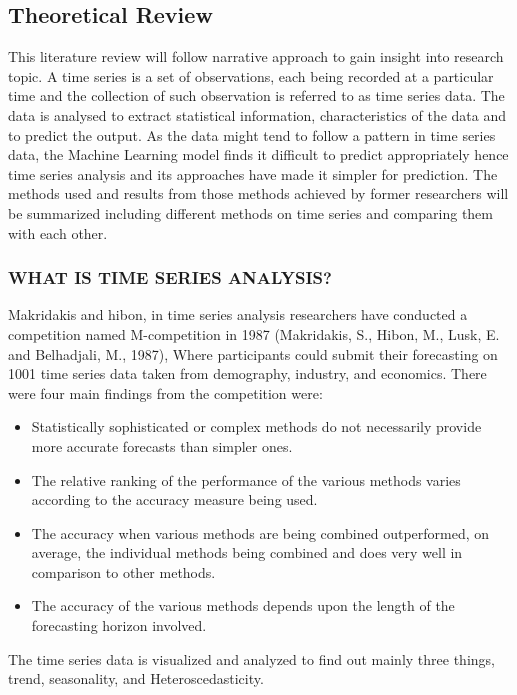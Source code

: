 \documentclass[12pt,a4paper]{article}
\begin{document}
\begin{flushleft}
		\subsection{Theoretical Review}
		This literature review will follow narrative approach to gain insight into research topic. A time series is a set of observations, each being recorded at a particular time and the collection of such observation is referred to as time series data. The data is analysed to extract statistical information, characteristics of the data and to predict the output. As the data might tend to follow a pattern in time series data, the Machine Learning model finds it difficult to predict appropriately hence time series analysis and its approaches have made it simpler for prediction. The methods used and results from those methods achieved by former researchers will be summarized including different methods on time series and comparing them with each other.
		
		\subsubsection{WHAT IS TIME SERIES ANALYSIS?}
		
		Makridakis and hibon, in time series analysis researchers have conducted a competition named M-competition in 1987 (Makridakis, S., Hibon, M., Lusk, E. and Belhadjali, M., 1987), Where participants could submit their forecasting on 1001 time series data taken from demography, industry, and economics. There were four main findings from the competition were:\\
		\begin{itemize}
		\item	Statistically sophisticated or complex methods do not necessarily provide more accurate forecasts than simpler ones.
		\item	The relative ranking of the performance of the various methods varies according to the accuracy measure being used.
		\item	The accuracy when various methods are being combined outperformed, on average, the individual methods being combined and does very well in comparison to other methods.
		\item	The accuracy of the various methods depends upon the length of the forecasting horizon involved.
		\end{itemize}
		
		The time series data is visualized and analyzed to find out mainly three things, trend, seasonality, and Heteroscedasticity. \\
		

\end{flushleft}
\end{document}
